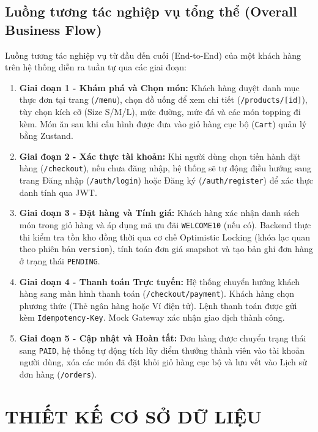 \documentclass[12pt,a4paper,oneside]{report}
\begin{document}
\section{Luồng tương tác nghiệp vụ tổng thể (Overall Business Flow)}
Luồng tương tác nghiệp vụ từ đầu đến cuối (End-to-End) của một khách hàng trên hệ thống diễn ra tuần tự qua các giai đoạn:
\begin{enumerate}
    \item \textbf{Giai đoạn 1 - Khám phá và Chọn món:} Khách hàng duyệt danh mục thực đơn tại trang (\texttt{/menu}), chọn đồ uống để xem chi tiết (\texttt{/products/}\allowbreak\texttt{[id]}), tùy chọn kích cỡ (Size S/M/L), mức đường, mức đá và các món topping đi kèm. Món ăn sau khi cấu hình được đưa vào giỏ hàng cục bộ (\texttt{Cart}) quản lý bằng Zustand.
    \item \textbf{Giai đoạn 2 - Xác thực tài khoản:} Khi người dùng chọn tiến hành đặt hàng (\texttt{/checkout}), nếu chưa đăng nhập, hệ thống sẽ tự động điều hướng sang trang Đăng nhập (\texttt{/auth/login}) hoặc Đăng ký (\texttt{/auth/register}) để xác thực danh tính qua JWT.
    \item \textbf{Giai đoạn 3 - Đặt hàng và Tính giá:} Khách hàng xác nhận danh sách món trong giỏ hàng và áp dụng mã ưu đãi \texttt{WELCOME10} (nếu có). Backend thực thi kiểm tra tồn kho đồng thời qua cơ chế Optimistic Locking (khóa lạc quan theo phiên bản \texttt{version}), tính toán đơn giá snapshot và tạo bản ghi đơn hàng ở trạng thái \texttt{PENDING}.
    \item \textbf{Giai đoạn 4 - Thanh toán Trực tuyến:} Hệ thống chuyển hướng khách hàng sang màn hình thanh toán (\texttt{/checkout/payment}). Khách hàng chọn phương thức (Thẻ ngân hàng hoặc Ví điện tử). Lệnh thanh toán được gửi kèm \texttt{Idempotency-Key}. Mock Gateway xác nhận giao dịch thành công.
    \item \textbf{Giai đoạn 5 - Cập nhật và Hoàn tất:} Đơn hàng được chuyển trạng thái sang \texttt{PAID}, hệ thống tự động tích lũy điểm thưởng thành viên vào tài khoản người dùng, xóa các món đã đặt khỏi giỏ hàng cục bộ và lưu vết vào Lịch sử đơn hàng (\texttt{/orders}).
\end{enumerate}



\chapter{THIẾT KẾ CƠ SỞ DỮ LIỆU}
\end{document}

